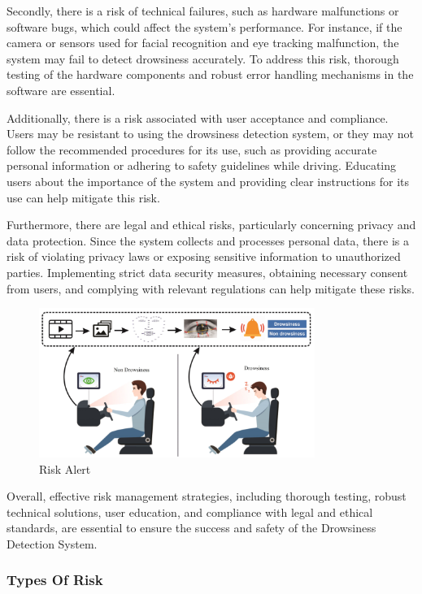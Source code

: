 \documentclass[12pt]{article}
\begin{document}
Secondly, there is a risk of technical failures, such as hardware malfunctions or software bugs, which could affect the system's performance. For instance, if the camera or sensors used for facial recognition and eye tracking malfunction, the system may fail to detect drowsiness accurately. To address this risk, thorough testing of the hardware components and robust error handling mechanisms in the software are essential.

Additionally, there is a risk associated with user acceptance and compliance. Users may be resistant to using the drowsiness detection system, or they may not follow the recommended procedures for its use, such as providing accurate personal information or adhering to safety guidelines while driving. Educating users about the importance of the system and providing clear instructions for its use can help mitigate this risk.

Furthermore, there are legal and ethical risks, particularly concerning privacy and data protection. Since the system collects and processes personal data, there is a risk of violating privacy laws or exposing sensitive information to unauthorized parties. Implementing strict data security measures, obtaining necessary consent from users, and complying with relevant regulations can help mitigate these risks.

\begin{figure}[h]
\centering
\includegraphics[width=0.8\textwidth]{risk}
\caption{Risk Alert}
\end{figure}
\FloatBarrier

Overall, effective risk management strategies, including thorough testing, robust technical solutions, user education, and compliance with legal and ethical standards, are essential to ensure the success and safety of the Drowsiness Detection System.

\subsubsection{Types Of Risk}
\end{document}
